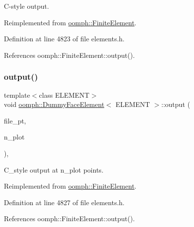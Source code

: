 C-\/style output. 



Reimplemented from \hyperlink{classoomph_1_1FiniteElement_a72cddd09f8ddbee1a20a1ff404c6943e}{oomph\+::\+Finite\+Element}.



Definition at line 4823 of file elements.\+h.



References oomph\+::\+Finite\+Element\+::output().

\mbox{\label{classoomph_1_1DummyFaceElement_a47f9db38874cb184f29e19839d0b7e81}} 
\subsubsection{\texorpdfstring{output()}{output()}\hspace{0.1cm}{\footnotesize\ttfamily [4/4]}}
{\footnotesize\ttfamily template$<$class E\+L\+E\+M\+E\+NT$>$ \\
void \hyperlink{classoomph_1_1DummyFaceElement}{oomph\+::\+Dummy\+Face\+Element}$<$ E\+L\+E\+M\+E\+NT $>$\+::output (\begin{DoxyParamCaption}\item[{F\+I\+LE $\ast$}]{file\+\_\+pt,  }\item[{const unsigned \&}]{n\+\_\+plot }\end{DoxyParamCaption})\hspace{0.3cm}{\ttfamily [inline]}, {\ttfamily [virtual]}}



C\+\_\+style output at n\+\_\+plot points. 



Reimplemented from \hyperlink{classoomph_1_1FiniteElement_adfaee690bb0608f03320eeb9d110d48c}{oomph\+::\+Finite\+Element}.



Definition at line 4827 of file elements.\+h.



References oomph\+::\+Finite\+Element\+::output().

\mbox{\label{classoomph_1_1DummyFaceElement_a2ee49bd3158d30c0c84c63dbd25e7196}} 
